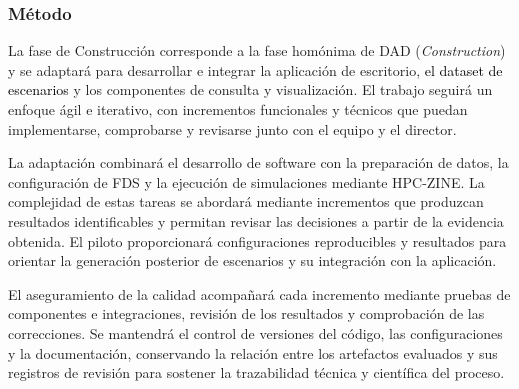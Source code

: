 \subsubsection{Método}\label{sec:construccion-metodo}

La fase de Construcción corresponde a la fase homónima de DAD
(\textit{Construction}) y se adaptará para desarrollar e integrar
la aplicación de escritorio, \textcolor{black}{el dataset de escenarios} y los
componentes de consulta y visualización. El trabajo seguirá un
enfoque ágil e iterativo, con incrementos funcionales y técnicos
que puedan implementarse, comprobarse y revisarse junto con el
equipo y el director.

La adaptación combinará el desarrollo de software con la
preparación de datos, la configuración de FDS y la ejecución de
simulaciones mediante HPC-ZINE. La complejidad de estas tareas se
abordará mediante incrementos que produzcan resultados
identificables y permitan revisar las decisiones a partir de la
evidencia obtenida. El piloto proporcionará configuraciones
reproducibles y resultados para orientar la generación posterior
de escenarios y su integración con la aplicación.

El aseguramiento de la calidad acompañará cada incremento
mediante pruebas de componentes e integraciones, revisión de los
resultados y comprobación de las correcciones. Se mantendrá el
control de versiones del código, las configuraciones y la
documentación, conservando la relación entre los artefactos
evaluados y sus registros de revisión para sostener la trazabilidad
técnica y científica del proceso.
